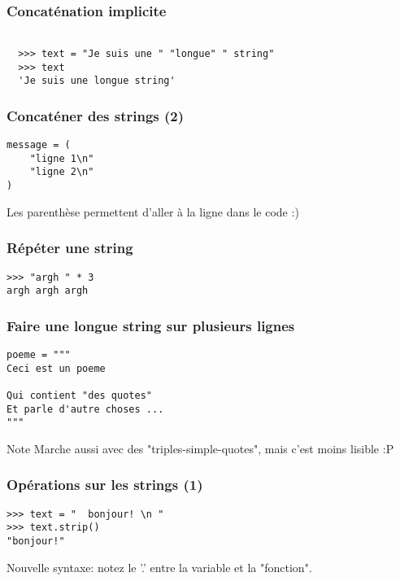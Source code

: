 \documentclass{beamer}
\begin{document}
\begin{frame}[fragile]
  \frametitle{Concaténation implicite}

\begin{lstlisting}

  >>> text = "Je suis une " "longue" " string"
  >>> text
  'Je suis une longue string'
\end{lstlisting}

\end{frame}


\begin{frame}[fragile]
  \frametitle{Concaténer des strings (2)}
\begin{lstlisting}
message = (
    "ligne 1\n"
    "ligne 2\n"
)
\end{lstlisting}

Les parenthèse permettent d'aller à la ligne dans le code :)

\end{frame}


\begin{frame}[fragile]
  \frametitle{Répéter une string}

\begin{lstlisting}
>>> "argh " * 3
argh argh argh
\end{lstlisting}

\end{frame}


\begin{frame}[fragile]
  \frametitle{Faire une longue string sur plusieurs lignes}

\begin{lstlisting}
poeme = """
Ceci est un poeme

Qui contient "des quotes"
Et parle d'autre choses ...
"""
\end{lstlisting}

\begin{block}{Note}
Marche aussi avec des "triples-simple-quotes", mais c'est moins lisible :P
\end{block}
\end{frame}


\begin{frame}[fragile]
  \frametitle{Opérations sur les strings (1)}

\begin{lstlisting}
>>> text = "  bonjour! \n "
>>> text.strip()
"bonjour!"
\end{lstlisting}
Nouvelle syntaxe: notez le '.' entre la variable et la "fonction".
\end{frame}
\end{document}
